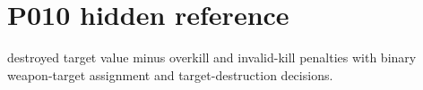 \section*{P010 hidden reference}\nMaximize destroyed target value minus overkill and invalid-kill penalties with binary weapon-target assignment and target-destruction decisions.\n